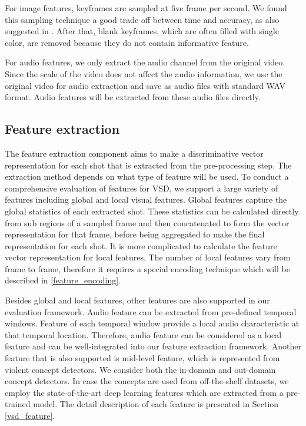 \documentclass[twocolumn]{bmcart}%
\begin{document}
For image features, keyframes are sampled at five frame per second. We found this sampling technique a good trade off between time and accuracy, as also suggested in \cite{merler2012semantic}. After that, blank keyframes, which are often filled with single color, are removed because they do not contain informative feature.

For audio features, we only extract the audio channel from the original video. Since the scale of the video does not affect the audio information, we use the original video for audio extraction and save as audio files with standard WAV format. Audio features will be extracted from these audio files directly.

\subsection{Feature extraction}
The feature extraction component aims to make a discriminative vector representation for each shot that is extracted from the pre-processing step. The extraction method depends on what type of feature will be used. To conduct a comprehensive evaluation of features for VSD, we support a large variety of features including global and local visual features. Global features capture the global statistics of each extracted shot. These statistics can be calculated directly from sub regions of a sampled frame and then concatenated to form the vector representation for that frame, before being aggregated to make the final representation for each shot. It is more complicated to calculate the feature vector representation for local features. The number of local features vary from frame to frame, therefore it requires a special encoding technique which will be described in \ref{feature_encoding}.

Besides global and local features, other features are also supported in our evaluation framework. Audio feature can be extracted from pre-defined temporal windows. Feature of each temporal window provide a local audio characteristic at that temporal location. Therefore, audio feature can be considered as a local feature and can be well-integrated into our feature extraction framework. Another feature that is also supported is mid-level feature, which is represented from violent concept detectors. We consider both the in-domain and out-domain concept detectors. In case the concepts are used from off-the-shelf datasets, we employ the state-of-the-art deep learning features which are extracted from a pre-trained model. The detail description of each feature is presented in Section \ref{vsd_feature}.
\end{document}
